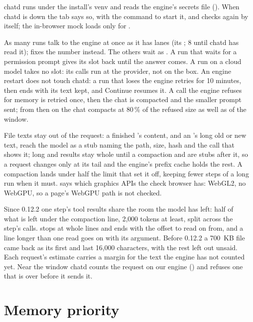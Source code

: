 chatd runs under the install's venv and reads the engine's secrets file (). When chatd is down the tab says so, with the command to start it, and checks again by itself; the in-browser mock loads only for .

As many runs talk to the engine at once as it has lanes (its  ; 8 until chatd has read it);  fixes the number instead. The others wait as . A run that waits for a permission prompt gives its slot back until the answer comes. A run on a cloud model takes no slot: its calls run at the provider, not on the box. An engine restart does not touch chatd: a run that loses the engine retries for 10 minutes, then ends  with its text kept, and Continue resumes it. A call the engine refuses for memory is retried once, then the chat is compacted and the smaller prompt sent; from then on the chat compacts at 80\,\% of the refused size as well as of the window.

File texts stay out of the request: a finished 's content, and an 's long old or new text, reach the model as a stub naming the path, size, hash and the  call that shows it; long  and  results stay whole until a compaction and are stubs after it, so a request changes only at its tail and the engine's prefix cache holds the rest. A compaction lands under half the limit that set it off, keeping fewer steps of a long run when it must.  says which graphics APIs the check browser has: WebGL2, no WebGPU, so a page's WebGPU path is not checked.

Since 0.12.2 one step's tool results share the room the model has left: half of what is left under the compaction line, 2{,}000 tokens at least, split across the step's calls.  stops at whole lines and ends with the offset to read on from, and a line longer than one read goes on with its  argument. Before 0.12.2 a 700~KB file came back as its first and last 16{,}000 characters, with the rest left out unsaid. Each request's estimate carries a margin for the text the engine has not counted yet. Near the window chatd counts the request on our engine () and refuses one that is over before it sends it.

\section{Memory priority}\label{sec:chat-priority}

